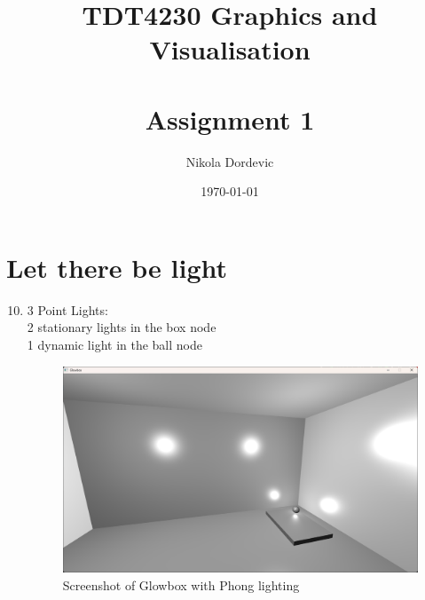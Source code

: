 \documentclass[11pt,a4paper]{report}
\title{TDT4230 Graphics and Visualisation \\\\ Assignment 1}
\author{Nikola Dordevic}
\date{\today}
\begin{document}
\section{Let there be light}
\begin{enumerate}[label=(\alph*)]\setcounter{enumi}{9}
	\item 3 Point Lights: \\ \hspace*{5mm} 2 stationary lights in the box node \\ \hspace*{5mm} 1 dynamic light in the ball node
	
	\begin{figure}[h]
		\centering
		\includegraphics[width=\textwidth]{images/task1j.png}
		\caption{Screenshot of Glowbox with Phong lighting}
	\end{figure}
\end{enumerate}

\clearpage
\end{document}
